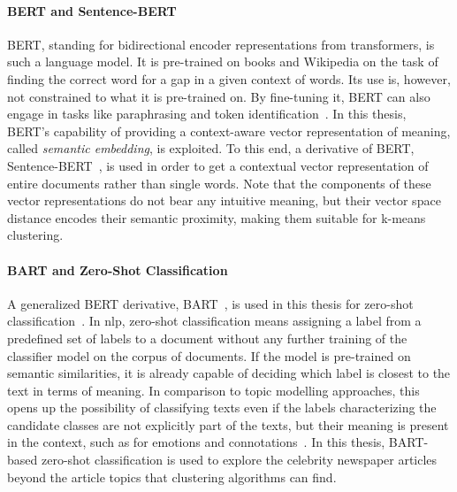 \paragraph{BERT and Sentence-BERT}\label{ch:sentencebert}
BERT, standing for bidirectional encoder representations from transformers, is such a language model. It is pre-trained on books and Wikipedia on the task of finding the correct word for a gap in a given context of words. Its use is, however, not constrained to what it is pre-trained on. By fine-tuning it, BERT can also engage in tasks like paraphrasing and token identification~\autocite{devlin_bert_2019}. In this thesis, BERT's capability of providing a context-aware vector representation of meaning, called \textit{semantic embedding}, is exploited. To this end, a derivative of BERT, Sentence-BERT~\autocite{reimers_sentence-bert_2019}, is used in order to get a contextual vector representation of entire documents rather than single words. Note that the components of these vector representations do not bear any intuitive meaning, but their vector space distance encodes their semantic proximity, making them suitable for k-means clustering.

\paragraph{BART and Zero-Shot Classification}\label{ch:zero_shot}
A generalized BERT derivative, BART~\autocite{lewis_bart_2020}, is used in this thesis for zero-shot classification~\autocite{huggingfacebart-large-mnli_facebookbart-large-mnli_nodate,davison_zero-shot_2020}. In \gls{nlp}, zero-shot classification means assigning a label from a predefined set of labels to a document without any further training of the classifier model on the corpus of documents. If the model is pre-trained on semantic similarities, it is already capable of deciding which label is closest to the text in terms of meaning. In comparison to topic modelling approaches, this opens up the possibility of classifying texts even if the labels characterizing the candidate classes are not explicitly part of the texts, but their meaning is present in the context, such as for emotions and connotations~\autocite{yin_benchmarking_2019}. In this thesis, BART-based zero-shot classification is used to explore the celebrity newspaper articles beyond the article topics that clustering algorithms can find.
